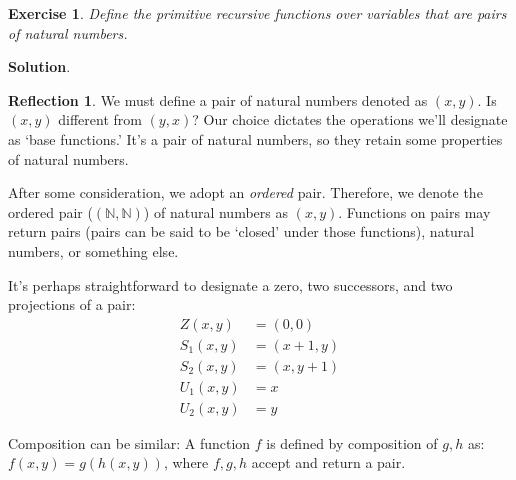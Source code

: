 \documentclass[11pt]{book}
\theoremstyle{definition}
\theoremstyle{plain}
\newtheorem{exercise}{Exercise}[chapter]
\theoremstyle{problemstyle}
\theoremstyle{remark}
\theoremstyle{definition}
\newtheorem{reflection}{Reflection}
\begin{document}
\begin{exercise}
    Define the primitive recursive functions over variables that are pairs of natural numbers.
\end{exercise}
\textbf{Solution}.
\begin{reflection}
    We must define a pair of natural numbers denoted as $(x,y)$. Is $(x,y)$ different from $(y,x)$? Our choice dictates the operations we'll designate as `base functions.' It's a pair of natural numbers, so they retain some properties of natural numbers.
\end{reflection}

After some consideration, we adopt an \emph{ordered} pair. Therefore, we denote the ordered pair ($(\mathbb{N},\mathbb{N})$) of natural numbers as $(x,y)$. Functions on pairs may return pairs (pairs can be said to be `closed' under those functions), natural numbers, or something else.

It's perhaps straightforward to designate a zero, two successors, and two projections of a pair:
    \begin{equation}
        \label{eq:base-functions-of-a-pair}
        \begin{aligned}
            Z(x,y)&=(0,0)\\
            S_1(x,y)&=(x+1,y)\\
            S_2(x,y)&=(x,y+1)\\
            U_1(x,y)&=x\\
            U_2(x,y)&=y
        \end{aligned}
    \end{equation}

    Composition can be similar: A function $f$ is defined by composition of $g,h$ as: $f(x,y)=g(h(x,y))$, where $f,g,h$ accept and return a pair.
\end{document}

